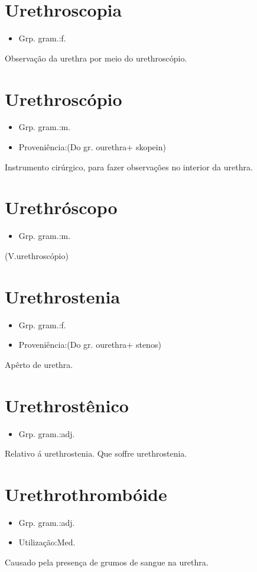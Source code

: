 \documentclass{article}
\begin{document}
\section{Urethroscopia}
\begin{itemize}
\item {Grp. gram.:f.}
\end{itemize}
Observação da urethra por meio do urethroscópio.
\section{Urethroscópio}
\begin{itemize}
\item {Grp. gram.:m.}
\end{itemize}
\begin{itemize}
\item {Proveniência:(Do gr. \textunderscore ourethra\textunderscore  + \textunderscore skopein\textunderscore )}
\end{itemize}
Instrumento cirúrgico, para fazer observações no interior da urethra.
\section{Urethróscopo}
\begin{itemize}
\item {Grp. gram.:m.}
\end{itemize}
(V.urethroscópio)
\section{Urethrostenia}
\begin{itemize}
\item {Grp. gram.:f.}
\end{itemize}
\begin{itemize}
\item {Proveniência:(Do gr. \textunderscore ourethra\textunderscore  + \textunderscore stenos\textunderscore )}
\end{itemize}
Apêrto de urethra.
\section{Urethrostênico}
\begin{itemize}
\item {Grp. gram.:adj.}
\end{itemize}
Relativo á urethrostenia.
Que soffre urethrostenia.
\section{Urethrothrombóide}
\begin{itemize}
\item {Grp. gram.:adj.}
\end{itemize}
\begin{itemize}
\item {Utilização:Med.}
\end{itemize}
Causado pela presença de grumos de sangue na urethra.
\end{document}
